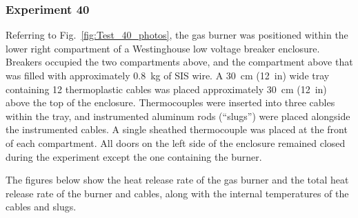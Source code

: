 \documentclass[12pt]{article}
\begin{document}
\clearpage

\subsubsection{Experiment 40}

Referring to Fig.~\ref{fig:Test_40_photos}, the gas burner was positioned within the lower right compartment of a Westinghouse low voltage breaker enclosure. Breakers occupied the two compartments above, and the compartment above that was filled with approximately 0.8~kg of SIS wire. A 30~cm (12~in) wide tray containing 12 thermoplastic cables was placed approximately 30~cm (12~in) above the top of the enclosure. Thermocouples were inserted into three cables within the tray, and instrumented aluminum rods (``slugs'') were placed alongside the instrumented cables. A single sheathed thermocouple was placed at the front of each compartment. All doors on the left side of the enclosure remained closed during the experiment except the one containing the burner.

The figures below show the heat release rate of the gas burner and the total heat release rate of the burner and cables, along with the internal temperatures of the cables and slugs.
\end{document}
